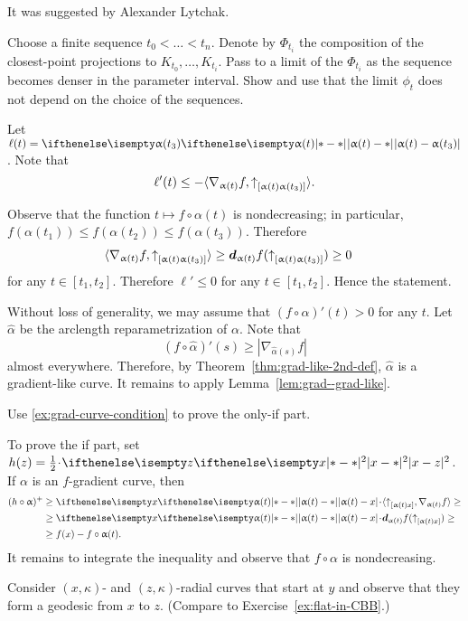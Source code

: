  It was suggested by Alexander Lytchak.

Choose a finite sequence $t_0<\dots<t_n$.
Denote by $\Phi_{t_i}$ the composition of the closest-point projections to $K_{t_0},\dots, K_{t_i}$.
Pass to a limit of the $\Phi_{t_i}$ as the sequence becomes denser in the parameter interval. 
Show and use that the limit $\phi_t$ does not depend on the choice of the sequences. 


Let $\ell(t)=\dist{\alpha(t)}{\alpha(t_3)}{}$.
Note that 
\[\ell'(t)\le -\langle \nabla_{\alpha(t)}f,\dir{\alpha(t)}{\alpha(t_3)}\rangle.\]

Observe that the function $t\mapsto f\circ\alpha(t)$ is nondecreasing;
in particular, $f(\alpha(t_1))\le f(\alpha(t_2))\le f(\alpha(t_3))$.
Therefore 
\begin{align*}\langle \nabla_{\alpha(t)}f,\dir{\alpha(t)}{\alpha(t_3)}\rangle&\ge\dd_{\alpha(t)}f(\dir{\alpha(t)}{\alpha(t_3)})\ge 0
\end{align*}
for any $t\in[t_1,t_2]$.
Therefore $\ell'\le 0$ for any $t\in[t_1,t_2]$.
Hence the statement.

Without loss of generality, we may assume that $(f\circ\alpha)'(t)>0$ for any $t$.
Let $\hat\alpha$ be the arclength reparametrization of $\alpha$.
Note that 
\[(f\circ\hat\alpha)'(s)\ge |\nabla_{\hat\alpha(s)}f|\]
almost everywhere.
Therefore, by Theorem~\ref{thm:grad-like-2nd-def}, $\hat\alpha$ is a gradient-like curve.
It remains to apply Lemma~\ref{lem:grad--grad-like}.

Use \ref{ex:grad-curve-condition} to prove the only-if part.

To prove the if part, set $h(z)=\tfrac12\cdot\dist[2]{x}{z}{}$.
If $\alpha$ is an $f$-gradient curve, then 
\begin{align*}
(h\circ\alpha)^+&\ge \dist{\alpha(t)}{x}{}\cdot\langle\dir{\alpha(t)}{x},\nabla_{\alpha(t)}f\rangle\ge
\\
&\ge \dist{\alpha(t)}{x}{}\cdot\dd_{\alpha(t)}f(\dir{\alpha(t)}{x})\ge 
\\
&\ge f(x)-f\circ\alpha(t).
\end{align*}
It remains to integrate the inequality and observe that $f\circ\alpha$ is nondecreasing.

Consider $(x,\kappa)$- and $(z,\kappa)$-radial curves that start at $y$
and observe that they form a geodesic from $x$ to $z$.
(Compare to Exercise~\ref{ex:flat-in-CBB}.)

